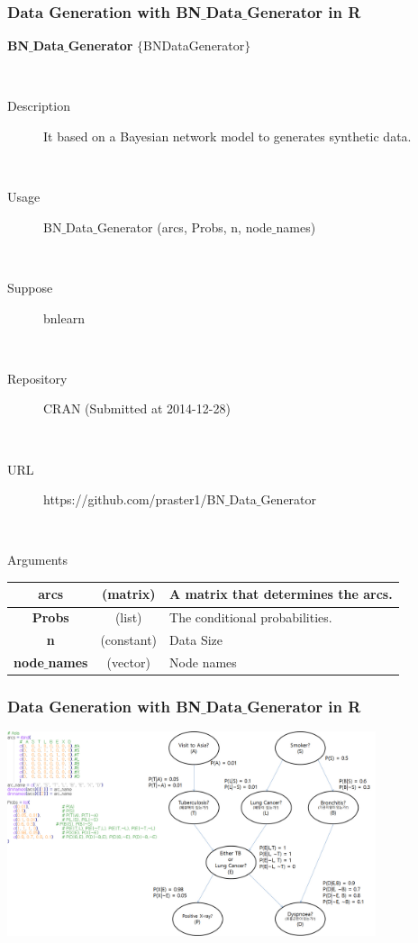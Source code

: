 \documentclass{beamer}
\begin{document}
\begin{frame}
\frametitle{Data Generation with BN$\_$Data$\_$Generator in R}

{\scriptsize{}
	\textbf{BN$\_$Data$\_$Generator} $\{$BNDataGenerator$\}$

	{}\	
	
	\begin{description}
		\item[Description] It based on a Bayesian network model to generates synthetic data.
		
		{}\
		
		\item[Usage] BN$\_$Data$\_$Generator (arcs, Probs, n, node$\_$names)

		{}\
			
		\item[Suppose] bnlearn

		{}\

		\item[Repository] CRAN (Submitted at 2014-12-28)

		{}\
		
		\item[URL] https://github.com/praster1/BN$\_$Data$\_$Generator		

		{}\
		
		\item[Arguments]
	\end{description}
	
	\begin{center}
				\begin{tabular}{c|c|l}
					\hline 
					\textbf{arcs} & (matrix) & A matrix that determines the arcs.\tabularnewline
					\hline 
					\textbf{Probs} & (list) & The conditional probabilities.\tabularnewline
					\hline 
					\textbf{n} & (constant) & Data Size\tabularnewline
					\hline 
					\textbf{node$\_$names} & (vector) & Node names\tabularnewline
					\hline 
				\end{tabular}
	\end{center}
}
\end{frame}




\begin{frame}
\frametitle{Data Generation with BN$\_$Data$\_$Generator in R}

{\scriptsize{}
	\begin{center}
		\includegraphics[height=170pt]{images/image24}
	\end{center}
}
\end{frame}
\end{document}
